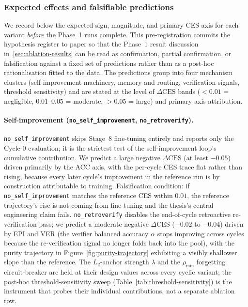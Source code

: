 \subsubsection*{Expected effects and falsifiable predictions}

We record below the expected sign, magnitude, and primary CES axis
for each variant \emph{before} the Phase~1 runs complete. This
pre-registration commits the hypothesis register to paper so that the
Phase~1 result discussion in~\cref{sec:ablation-results} can be read as
confirmation, partial confirmation, or falsification against a fixed
set of predictions rather than as a post-hoc rationalisation fitted to
the data. The predictions group into four mechanism clusters
(self-improvement machinery, memory and routing, verification signals,
threshold sensitivity) and are stated at the level of
$\Delta\text{CES}$ bands ($<0.01$ = negligible, $0.01$--$0.05$ =
moderate, $>0.05$ = large) and primary axis attribution.

\paragraph{Self-improvement
(\texttt{no\_self\_improvement}, \texttt{no\_retroverify}).}
\texttt{no\_self\_improvement} skips Stage~8 fine-tuning entirely and
reports only the Cycle-0 evaluation; it is the strictest test of the
self-improvement loop's cumulative contribution. We predict a large
negative $\Delta\text{CES}$ (at least $-0.05$) driven primarily by the
ACC axis, with the per-cycle CES trace flat rather than rising,
because every later cycle's improvement in the reference run is by
construction attributable to training. Falsification condition: if
\texttt{no\_self\_improvement} matches the reference CES within
$0.01$, the reference trajectory's rise is not coming from
fine-tuning and the thesis's central engineering claim fails.
\texttt{no\_retroverify} disables the end-of-cycle retroactive
re-verification pass; we predict a moderate negative
$\Delta\text{CES}$ ($-0.02$ to $-0.04$) driven by EPI and VER (the
verifier balanced accuracy $\alpha$ stops improving across cycles
because the re-verification signal no longer folds back into the
pool), with the purity trajectory in Figure~\ref{fig:purity-trajectory}
exhibiting a visibly shallower slope than the reference. The
$L_2$-anchor strength $\lambda$ and the $\rho_{\min}$ forgetting
circuit-breaker are held at their design values across every cyclic
variant; the post-hoc threshold-sensitivity sweep
(Table~\ref{tab:threshold-sensitivity}) is the instrument that
probes their individual contributions, not a separate ablation row.

